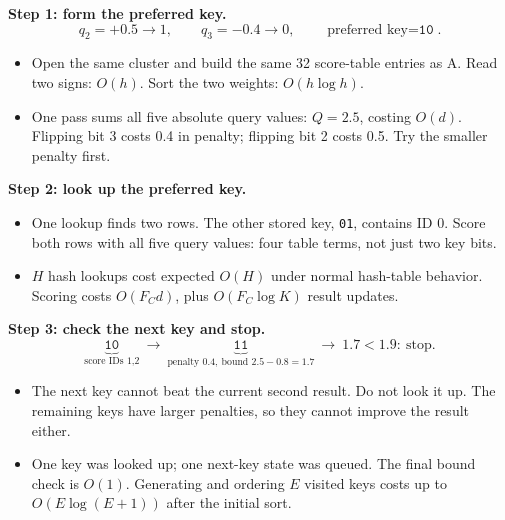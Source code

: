 \textbf{Step 1: form the preferred key.}
\[
 q_2=+0.5\to1,\qquad q_3=-0.4\to0,
 \qquad\boxed{\text{preferred key}=\texttt{10}}.
\]
\begin{itemize}
\item Open the same cluster and build the same 32 score-table entries as A. Read two signs: $O(h)$. Sort the two weights: $O(h\log h)$.
\item One pass sums all five absolute query values: $Q=2.5$, costing $O(d)$. Flipping bit 3 costs 0.4 in penalty; flipping bit 2 costs 0.5. Try the smaller penalty first.
\end{itemize}

\textbf{Step 2: look up the preferred key.}
\begin{center}
\end{center}
\begin{itemize}
\item One lookup finds two rows. The other stored key, \texttt{01}, contains ID 0. Score both rows with all five query values: four table terms, not just two key bits.
\item $H$ hash lookups cost expected $O(H)$ under normal hash-table behavior. Scoring costs
$O(F_Cd)$, plus $O(F_C\log K)$ result updates.
\end{itemize}

\textbf{Step 3: check the next key and stop.}
\[
 \underbrace{\texttt{10}}_{\text{score IDs 1,2}}
 \ \longrightarrow\
 \underbrace{\texttt{11}}_{\text{penalty }0.4,\ \text{bound }2.5-0.8=1.7}
 \ \longrightarrow\ \boxed{1.7<1.9:\ \text{stop}}.
\]
\begin{itemize}
\item The next key cannot beat the current second result. Do not look it up. The remaining keys have larger penalties, so they cannot improve the result either.
\item One key was looked up; one next-key state was queued. The final bound check is $O(1)$.
Generating and ordering $E$ visited keys costs up to $O(E\log(E+1))$ after the initial sort.
\end{itemize}

